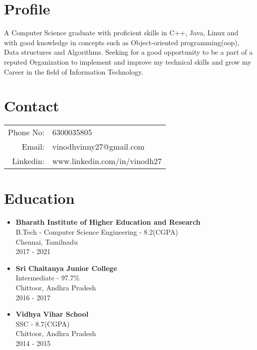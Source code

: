 \documentclass[11pt,a4paper]{article}
\begin{document}
\begin{tcolorbox}
	\begin{minipage}[t]{9cm}
		\vspace*{-0.5cm}
		\begin{tcolorbox}[grow to left by=0.6cm,colback=gray!25,colframe=white]
			\section*{Profile}
	A Computer Science graduate with proficient skills in C++, Java, Linux and with
good knowledge in concepts such as Object-oriented programming(oop), Data structures
and Algorithms. Seeking for a good opportunity to be a part of a reputed Organization
to implement and improve my technical skills and grow my Career in the field of
Information Technology.

			\section*{Contact}
			\begin{tabular}{r l}
				Phone No: & 6300035805 \\
				Email: & vinodhvinny27@gmail.com \\
				Linkedin: & www.linkedin.com/in/vinodh27 \\
			\end{tabular}

			\section*{Education}
			\begin{itemize}[leftmargin=3mm]
			\item {
			\textbf{Bharath Institute of Higher Education and Research} \\
			B.Tech {-} Computer Science Engineering {-} 8.2(CGPA) \\
			Chennai, Tamilnadu \\
			2017 {-} 2021
			}
			\item {
			\textbf{Sri Chaitanya Junior College} \\
			Intermediate {-} 97.7\% \\
			Chittoor, Andhra Pradesh \\
			2016 {-} 2017
			}
			\item {
			\textbf{Vidhya Vihar School} \\
			SSC {-} 8.7(CGPA) \\
			Chittoor, Andhra Pradesh \\
			2014 {-} 2015
			}
			\end{itemize}


\end{tcolorbox}
\end{minipage}
\end{tcolorbox}
\end{document}
